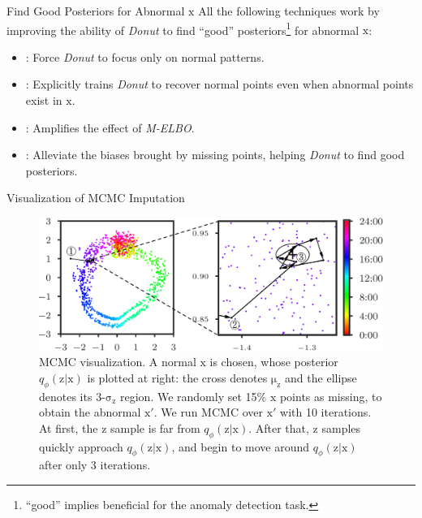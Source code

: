 \documentclass[usenames,dvipsnames]{beamer}
\newcommand{\DONUT}{\textit{Donut}}
\newcommand{\vv}[1]{\bm{\mathrm{{#1}}}}
\begin{document}
\begin{frame}{Find Good Posteriors for Abnormal $\vv{x}$}
  All the following techniques work by improving the ability of \DONUT{} to find ``good'' posteriors\footnote{``good'' implies beneficial for the anomaly detection task.} for abnormal $\vv{x}$:

  \begin{itemize}\setlength\itemsep{.2em}
    \item {}: Force \DONUT{} to focus only on normal patterns.
    \item {}: Explicitly trains \DONUT{} to recover normal points even when abnormal points exist in $\vv{x}$.
    \item {}: Amplifies the effect of \textit{M-ELBO}.
    \item {}: Alleviate the biases brought by missing points, helping \DONUT{} to find good posteriors.
  \end{itemize}
\end{frame}

\begin{frame}{Visualization of MCMC Imputation}
  \begin{figure}
    \centering
    \includegraphics[height=.5\textheight]{mcmc_z_trace}
	\caption{
		MCMC visualization.
		A normal $\vv{x}$ is chosen, whose posterior $q_{\phi}(\vv{z}|\vv{x})$ is plotted at right: the cross denotes $\vv{\mu_z}$ and the ellipse denotes its 3-$\vv{\sigma_z}$ region.
		We randomly set 15\% $\vv{x}$ points as missing, to obtain the abnormal $\vv{x}'$.
		We run MCMC over $\vv{x}'$ with 10 iterations.
		At first, the $\vv{z}$ sample is far from $q_{\phi}(\vv{z}|\vv{x})$.
		After that, $\vv{z}$ samples quickly approach $q_{\phi}(\vv{z}|\vv{x})$, and begin to move around $q_{\phi}(\vv{z}|\vv{x})$ after only 3 iterations.
	}
  \end{figure}
\end{frame}
\end{document}
